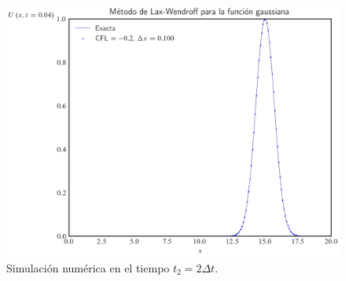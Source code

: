 \begin{figure}[ht!]
    \includegraphics[width=.30\paperwidth]{../snapshots/lax-wendroffgaussiana1d-2.png}
    \caption{Simulación numérica en el tiempo $t_{2}=2\Delta t$.}
    \label{fig:example1t2}
\end{figure}

